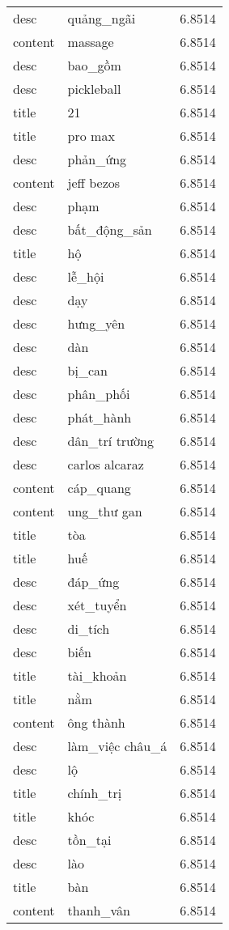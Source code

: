 \documentclass{article}
\begin{document}
\begin{tabular}{lll}
desc & quảng\_ngãi & 6.8514\\
content & massage & 6.8514\\
desc & bao\_gồm & 6.8514\\
desc & pickleball & 6.8514\\
title & 21 & 6.8514\\
title & pro max & 6.8514\\
desc & phản\_ứng & 6.8514\\
content & jeff bezos & 6.8514\\
desc & phạm & 6.8514\\
desc & bất\_động\_sản & 6.8514\\
title & hộ & 6.8514\\
desc & lễ\_hội & 6.8514\\
desc & dạy & 6.8514\\
desc & hưng\_yên & 6.8514\\
desc & dàn & 6.8514\\
desc & bị\_can & 6.8514\\
desc & phân\_phối & 6.8514\\
desc & phát\_hành & 6.8514\\
desc & dân\_trí trường & 6.8514\\
desc & carlos alcaraz & 6.8514\\
content & cáp\_quang & 6.8514\\
content & ung\_thư gan & 6.8514\\
title & tòa & 6.8514\\
title & huế & 6.8514\\
desc & đáp\_ứng & 6.8514\\
desc & xét\_tuyển & 6.8514\\
desc & di\_tích & 6.8514\\
desc & biến & 6.8514\\
title & tài\_khoản & 6.8514\\
title & nằm & 6.8514\\
content & ông thành & 6.8514\\
desc & làm\_việc châu\_á & 6.8514\\
desc & lộ & 6.8514\\
title & chính\_trị & 6.8514\\
title & khóc & 6.8514\\
desc & tồn\_tại & 6.8514\\
desc & lào & 6.8514\\
title & bàn & 6.8514\\
content & thanh\_vân & 6.8514\\

\end{tabular}
\end{document}
